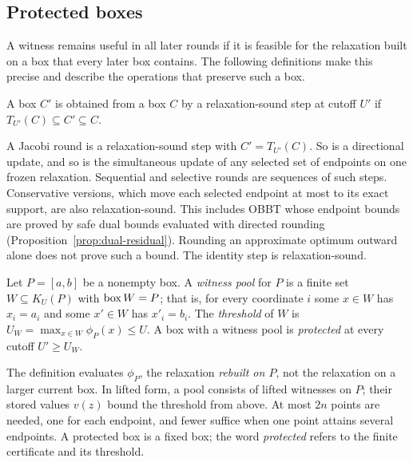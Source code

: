 \subsection{Protected boxes}\label{sec:cert-protected}

A witness remains useful in all later rounds if it is feasible for the
relaxation built on a box that every later box contains. The following
definitions make this precise and describe the operations that preserve
such a box.

\begin{definition}
A box $C'$ is obtained from a box $C$ by a relaxation-sound step at
cutoff $U'$ if $T_{U'}(C)\subseteq C'\subseteq C$.
\end{definition}

A Jacobi round is a relaxation-sound step with $C'=T_{U'}(C)$. So is a
directional update, and so is the simultaneous update of any selected set
of endpoints on one frozen relaxation. Sequential and selective rounds
are sequences of such steps. Conservative versions, which move each
selected endpoint at most to its exact support, are also relaxation-sound.
This includes OBBT whose endpoint bounds are proved by safe dual bounds
evaluated with directed rounding (Proposition~\ref{prop:dual-residual}).
Rounding an approximate optimum outward alone does not prove such a bound.
The identity step is relaxation-sound.

\begin{definition}
Let $P=[a,b]$ be a nonempty box. A \emph{witness pool} for $P$ is a
finite set $W\subseteq K_U(P)$ with $\operatorname{box} W=P$; that is, for every
coordinate $i$ some $x\in W$ has $x_i=a_i$ and some $x'\in W$ has
$x'_i=b_i$. The \emph{threshold} of $W$ is
$U_W=\max_{x\in W}\phi_P(x)\le U$. A box with a witness pool is
\emph{protected} at every cutoff $U'\ge U_W$.
\end{definition}

The definition evaluates $\phi_P$, the relaxation \emph{rebuilt on $P$},
not the relaxation on a larger current box. In lifted form, a pool
consists of lifted witnesses on $P$; their stored values $v(z)$ bound the
threshold from above. At most $2n$ points are needed, one for each
endpoint, and fewer suffice when one point attains several endpoints. A
protected box is a fixed box; the word \emph{protected} refers to the
finite certificate and its threshold.

